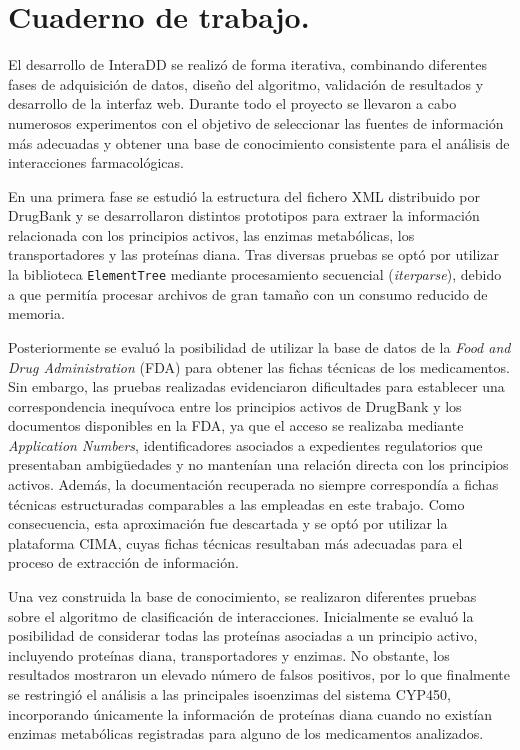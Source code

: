 
\section{Cuaderno de trabajo.}

El desarrollo de InteraDD se realizó de forma iterativa, combinando diferentes fases de adquisición de datos, diseño del algoritmo, validación de resultados y desarrollo de la interfaz web. Durante todo el proyecto se llevaron a cabo numerosos experimentos con el objetivo de seleccionar las fuentes de información más adecuadas y obtener una base de conocimiento consistente para el análisis de interacciones farmacológicas.

En una primera fase se estudió la estructura del fichero XML distribuido por DrugBank y se desarrollaron distintos prototipos para extraer la información relacionada con los principios activos, las enzimas metabólicas, los transportadores y las proteínas diana. Tras diversas pruebas se optó por utilizar la biblioteca \texttt{ElementTree} mediante procesamiento secuencial (\textit{iterparse}), debido a que permitía procesar archivos de gran tamaño con un consumo reducido de memoria.

Posteriormente se evaluó la posibilidad de utilizar la base de datos de la \textit{Food and Drug Administration} (FDA) para obtener las fichas técnicas de los medicamentos. Sin embargo, las pruebas realizadas evidenciaron dificultades para establecer una correspondencia inequívoca entre los principios activos de DrugBank y los documentos disponibles en la FDA, ya que el acceso se realizaba mediante \textit{Application Numbers}, identificadores asociados a expedientes regulatorios que presentaban ambigüedades y no mantenían una relación directa con los principios activos. Además, la documentación recuperada no siempre correspondía a fichas técnicas estructuradas comparables a las empleadas en este trabajo. Como consecuencia, esta aproximación fue descartada y se optó por utilizar la plataforma CIMA, cuyas fichas técnicas resultaban más adecuadas para el proceso de extracción de información.

Una vez construida la base de conocimiento, se realizaron diferentes pruebas sobre el algoritmo de clasificación de interacciones. Inicialmente se evaluó la posibilidad de considerar todas las proteínas asociadas a un principio activo, incluyendo proteínas diana, transportadores y enzimas. No obstante, los resultados mostraron un elevado número de falsos positivos, por lo que finalmente se restringió el análisis a las principales isoenzimas del sistema CYP450, incorporando únicamente la información de proteínas diana cuando no existían enzimas metabólicas registradas para alguno de los medicamentos analizados.


